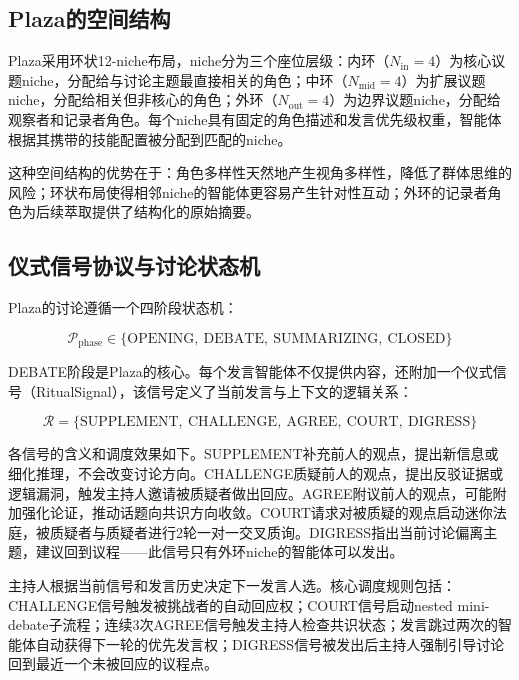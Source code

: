 \documentclass[conference]{IEEEtran}
\begin{document}
\subsection{Plaza的空间结构}

Plaza采用环状12-niche布局，niche分为三个座位层级：内环（$N_{\text{in}}=4$）为核心议题niche，分配给与讨论主题最直接相关的角色；中环（$N_{\text{mid}}=4$）为扩展议题niche，分配给相关但非核心的角色；外环（$N_{\text{out}}=4$）为边界议题niche，分配给观察者和记录者角色。每个niche具有固定的角色描述和发言优先级权重，智能体根据其携带的技能配置被分配到匹配的niche。

这种空间结构的优势在于：角色多样性天然地产生视角多样性，降低了群体思维的风险；环状布局使得相邻niche的智能体更容易产生针对性互动；外环的记录者角色为后续萃取提供了结构化的原始摘要。

\subsection{仪式信号协议与讨论状态机}

Plaza的讨论遵循一个四阶段状态机：

\begin{equation}
\mathcal{P}_{\mathrm{phase}} \in \{\mathrm{OPENING},\ \mathrm{DEBATE},\ \mathrm{SUMMARIZING},\ \mathrm{CLOSED}\}
\label{eq:plaza_phases}
\end{equation}

DEBATE阶段是Plaza的核心。每个发言智能体不仅提供内容，还附加一个仪式信号（RitualSignal），该信号定义了当前发言与上下文的逻辑关系：

\begin{equation}
\mathcal{R} = \{\mathrm{SUPPLEMENT},\ \mathrm{CHALLENGE},\ \mathrm{AGREE},\ \mathrm{COURT},\ \mathrm{DIGRESS}\}
\label{eq:ritual}
\end{equation}

各信号的含义和调度效果如下。SUPPLEMENT补充前人的观点，提出新信息或细化推理，不会改变讨论方向。CHALLENGE质疑前人的观点，提出反驳证据或逻辑漏洞，触发主持人邀请被质疑者做出回应。AGREE附议前人的观点，可能附加强化论证，推动话题向共识方向收敛。COURT请求对被质疑的观点启动迷你法庭，被质疑者与质疑者进行2轮一对一交叉质询。DIGRESS指出当前讨论偏离主题，建议回到议程——此信号只有外环niche的智能体可以发出。

主持人根据当前信号和发言历史决定下一发言人选。核心调度规则包括：CHALLENGE信号触发被挑战者的自动回应权；COURT信号启动nested mini-debate子流程；连续3次AGREE信号触发主持人检查共识状态；发言跳过两次的智能体自动获得下一轮的优先发言权；DIGRESS信号被发出后主持人强制引导讨论回到最近一个未被回应的议程点。
\end{document}
